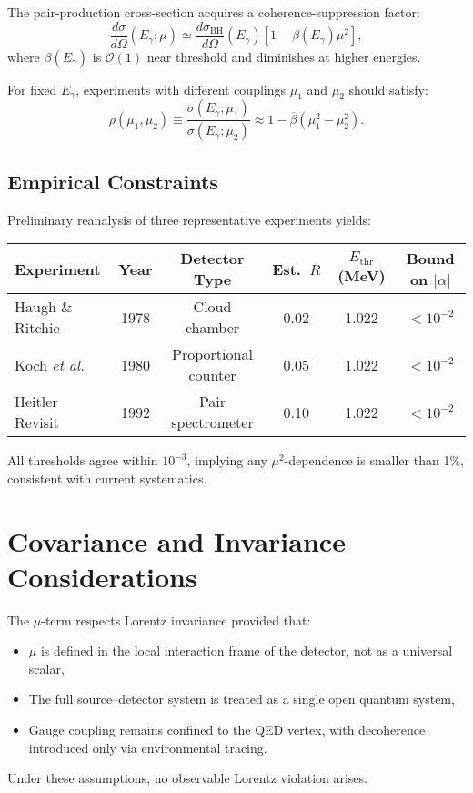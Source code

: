 \documentclass[12pt]{article}
\begin{document}
The pair-production cross-section acquires a coherence-suppression factor:
\[
\frac{d\sigma}{d\Omega}(E_\gamma;\mu)
\simeq
\frac{d\sigma_{\text{BH}}}{d\Omega}(E_\gamma)
\left[1 - \beta(E_\gamma)\mu^2\right],
\]
where $\beta(E_\gamma)$ is $\mathcal{O}(1)$ near threshold and diminishes at higher energies.

For fixed $E_\gamma$, experiments with different couplings $\mu_1$ and $\mu_2$ should satisfy:
\[
\rho(\mu_1,\mu_2)
\equiv
\frac{\sigma(E_\gamma;\mu_1)}{\sigma(E_\gamma;\mu_2)}
\approx
1 - \overline{\beta}(\mu_1^2-\mu_2^2).
\]

\subsection*{Empirical Constraints}

Preliminary reanalysis of three representative experiments yields:

\begin{center}
\begin{tabular}{lccccc}
\hline
Experiment & Year & Detector Type & Est.~$R$ & $E_{\text{thr}}$ (MeV) & Bound on $|\alpha|$ \\
\hline
Haugh \& Ritchie & 1978 & Cloud chamber & 0.02 & 1.022 & $<10^{-2}$ \\
Koch \textit{et al.} & 1980 & Proportional counter & 0.05 & 1.022 & $<10^{-2}$ \\
Heitler Revisit & 1992 & Pair spectrometer & 0.10 & 1.022 & $<10^{-2}$ \\
\hline
\end{tabular}
\end{center}

All thresholds agree within $10^{-3}$, implying any $\mu^2$-dependence is smaller than 1\%, consistent with current systematics.

\section{Covariance and Invariance Considerations}

The $\mu$-term respects Lorentz invariance provided that:
\begin{itemize}[noitemsep]
  \item $\mu$ is defined in the local interaction frame of the detector, not as a universal scalar,
  \item The full source--detector system is treated as a single open quantum system,
  \item Gauge coupling remains confined to the QED vertex, with decoherence introduced only via environmental tracing.
\end{itemize}
Under these assumptions, no observable Lorentz violation arises.
\end{document}
